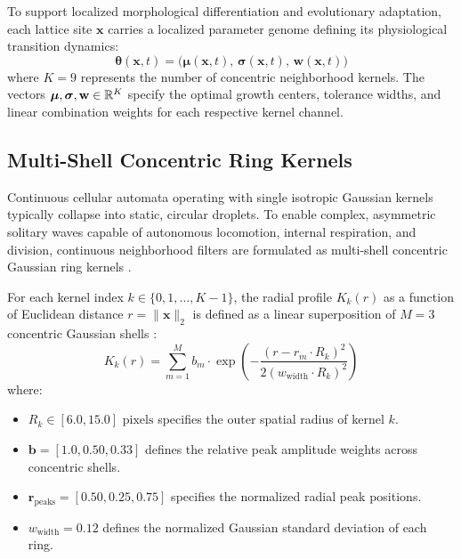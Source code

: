 To support localized morphological differentiation and evolutionary adaptation, each lattice site $\mathbf{x}$ carries a localized parameter genome defining its physiological transition dynamics:
\begin{equation}
\boldsymbol{\theta}(\mathbf{x}, t) = \Big( \boldsymbol{\mu}(\mathbf{x}, t), \, \boldsymbol{\sigma}(\mathbf{x}, t), \, \mathbf{w}(\mathbf{x}, t) \Big)
\label{eq:parameter_genome}
\end{equation}
where $K = 9$ represents the number of concentric neighborhood kernels. The vectors $\boldsymbol{\mu}, \boldsymbol{\sigma}, \mathbf{w} \in \mathbb{R}^K$ specify the optimal growth centers, tolerance widths, and linear combination weights for each respective kernel channel.

\subsection{Multi-Shell Concentric Ring Kernels}
\label{subsec:model_multishell_kernels}

Continuous cellular automata operating with single isotropic Gaussian kernels typically collapse into static, circular droplets. To enable complex, asymmetric solitary waves capable of autonomous locomotion, internal respiration, and division, continuous neighborhood filters are formulated as multi-shell concentric Gaussian ring kernels \parencite{chan2019lenia, plantec2025flowlenia}.

For each kernel index $k \in \{0, 1, \dots, K-1\}$, the radial profile $K_k(r)$ as a function of Euclidean distance $r = \|\mathbf{x}\|_2$ is defined as a linear superposition of $M = 3$ concentric Gaussian shells \parencite{plantec2025flowlenia}:
\begin{equation}
K_k(r) = \sum_{m=1}^{M} b_m \cdot \exp\left( -\frac{\left(r - r_m \cdot R_k\right)^2}{2 \left(w_{\text{width}} \cdot R_k\right)^2} \right)
\label{eq:multishell_kernel_formula}
\end{equation}
where:
\begin{itemize}
    \item $R_k \in [6.0, 15.0]\text{ pixels}$ specifies the outer spatial radius of kernel $k$.
    \item $\mathbf{b} = [1.0, 0.50, 0.33]$ defines the relative peak amplitude weights across concentric shells.
    \item $\mathbf{r}_{\text{peaks}} = [0.50, 0.25, 0.75]$ specifies the normalized radial peak positions.
    \item $w_{\text{width}} = 0.12$ defines the normalized Gaussian standard deviation of each ring.
\end{itemize}

